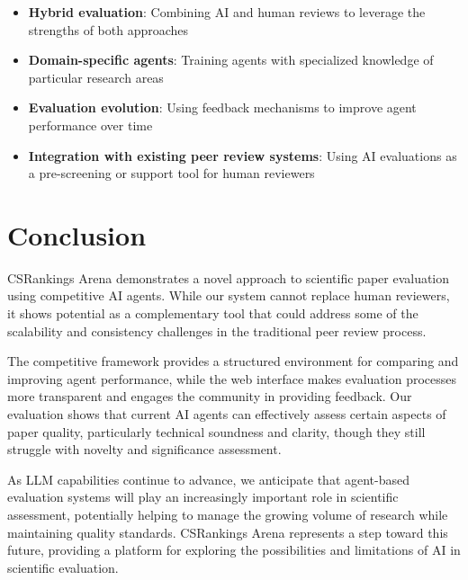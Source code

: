 \documentclass[conference]{IEEEtran}
\begin{document}
\begin{itemize}
    \item \textbf{Hybrid evaluation}: Combining AI and human reviews to leverage the strengths of both approaches
    
    \item \textbf{Domain-specific agents}: Training agents with specialized knowledge of particular research areas
    
    \item \textbf{Evaluation evolution}: Using feedback mechanisms to improve agent performance over time
    
    \item \textbf{Integration with existing peer review systems}: Using AI evaluations as a pre-screening or support tool for human reviewers
\end{itemize}

\section{Conclusion}
CSRankings Arena demonstrates a novel approach to scientific paper evaluation using competitive AI agents. While our system cannot replace human reviewers, it shows potential as a complementary tool that could address some of the scalability and consistency challenges in the traditional peer review process.

The competitive framework provides a structured environment for comparing and improving agent performance, while the web interface makes evaluation processes more transparent and engages the community in providing feedback. Our evaluation shows that current AI agents can effectively assess certain aspects of paper quality, particularly technical soundness and clarity, though they still struggle with novelty and significance assessment.

As LLM capabilities continue to advance, we anticipate that agent-based evaluation systems will play an increasingly important role in scientific assessment, potentially helping to manage the growing volume of research while maintaining quality standards. CSRankings Arena represents a step toward this future, providing a platform for exploring the possibilities and limitations of AI in scientific evaluation.


\end{document}
